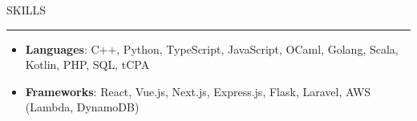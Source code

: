 \documentclass[letterpaper, 11pt]{article}
\def\sectionlineskip{\medskip}
\def\sectionskip{\medskip}
\def \entryspacing {-0pt}
\newcommand{\SectionHeading}[1]{
  \sectionskip
  \raggedright\raggedbottom\MakeUppercase{\large{#1}}
  \sectionlineskip
  \hrule
  \color{black}
}
\newcommand{\ResumeItem}[2]{
  \item{
    \textbf{#1}{: #2 \vspace{-2.835pt}}
  }
}
\newcommand{\ResumeSubItem}[2]{\ResumeItem{#1}{#2}\vspace{-2.835pt}}
\newcommand{\ResumeEntryStart}{\begin{itemize}[leftmargin=0mm, label={}]}
\newcommand{\ResumeEntryEnd}{\end{itemize}\vspace{-2.835pt}} %
\newcommand{\ProjectItemListStart}{\begin{itemize}[leftmargin=*, label=$\bullet$]}
\newcommand{\ProjectItemListEnd}{\end{itemize}\vspace{\entryspacing}}
\begin{document}

  \SectionHeading{Skills}
  \ResumeEntryStart
    \ResumeItem{Languages}{ C++, Python, TypeScript, JavaScript, OCaml, Golang, Scala, Kotlin, PHP, SQL, tCPA }
    \ResumeItem{Frameworks}{ React, Vue.js, Next.js, Express.js, Flask, Laravel, AWS (Lambda, DynamoDB) }
  \ResumeEntryEnd
\end{document}
